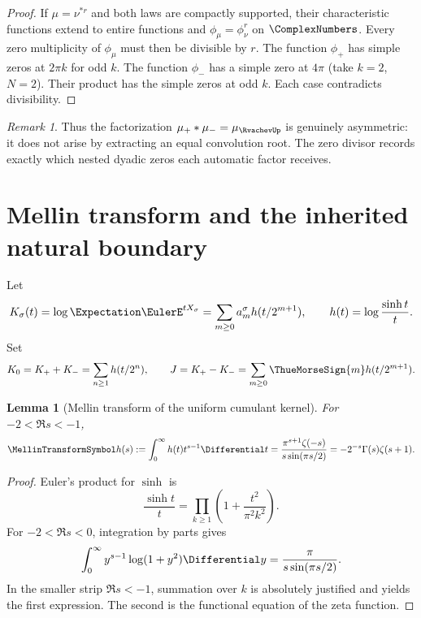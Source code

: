 \documentclass[11pt,oneside]{article}
\numberwithin{equation}{section}
\newtheorem{lemma}[theorem]{Lemma}
\theoremstyle{definition}
\theoremstyle{remark}
\newtheorem{remark}[theorem]{Remark}
\begin{document}
\begin{proof}
If $\mu=\nu^{*r}$ and both laws are compactly supported, their characteristic functions
extend to entire functions and $\phi_\mu=\phi_\nu^r$ on $\ComplexNumbers$.  Every zero multiplicity of
$\phi_\mu$ must then be divisible by $r$.  The function $\phi_+$ has simple zeros at
$2\pi k$ for odd $k$.  The function $\phi_-$ has a simple zero at $4\pi$ (take $k=2$,
$N=2$).  Their product has the simple zeros at odd $k$.  Each case contradicts
divisibility.
\end{proof}

\begin{remark}
Thus the factorization $\mu_+*\mu_-=\mu_{\RvachevUp}$ is genuinely asymmetric: it does not arise
by extracting an equal convolution root.  The zero divisor records exactly which nested
dyadic zeros each automatic factor receives.
\end{remark}

\section{Mellin transform and the inherited natural boundary}
\label{sec:mellin}

Let
\begin{equation}
 K_\sigma(t)=\log\Expectation\EulerE^{tX_\sigma}
 =\sum_{m\ge0}a_m^\sigma h(t/2^{m+1}),
 \qquad h(t)=\log\frac{\sinh t}{t}.
 \label{eq:Ksigma}
\end{equation}
Set
\begin{equation}
 K_0=K_++K_-=
 \sum_{n\ge1}h(t/2^n),
 \qquad
 J=K_+-K_-=\sum_{m\ge0}\ThueMorseSign{m}h(t/2^{m+1}).
 \label{eq:K0J}
\end{equation}

\begin{lemma}[Mellin transform of the uniform cumulant kernel]
\label{lem:mellin-h}
For $-2<\Re s<-1$,
\begin{equation}
 \MellinTransformSymbol h(s):=\int_0^\infty h(t)t^{s-1}\Differential t
 =\frac{\pi^{s+1}\zeta(-s)}{s\sin(\pi s/2)}
 =-2^{-s}\Gamma(s)\zeta(s+1).
 \label{eq:mellin-h}
\end{equation}
\end{lemma}

\begin{proof}
Euler's product for $\sinh$ is
\[
 \frac{\sinh t}{t}=\prod_{k\ge1}\left(1+\frac{t^2}{\pi^2k^2}\right).
\]
For $-2<\Re s<0$, integration by parts gives
\[
 \int_0^\infty y^{s-1}\log(1+y^2)\Differential y
 =\frac{\pi}{s\sin(\pi s/2)}.
\]
In the smaller strip $\Re s<-1$, summation over $k$ is absolutely justified and yields the
first expression.  The second is the functional equation of the zeta function.
\end{proof}
\end{document}
